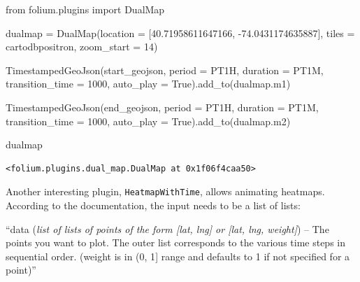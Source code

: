 \documentclass[
  letterpaper,
  DIV=11,
  numbers=noendperiod]{scrreprt}
\newenvironment{Shaded}{\begin{snugshade}}{\end{snugshade}}
\newcommand{\DecValTok}[1]{\textcolor[rgb]{0.68,0.00,0.00}{#1}}
\newcommand{\FloatTok}[1]{\textcolor[rgb]{0.68,0.00,0.00}{#1}}
\newcommand{\ImportTok}[1]{\textcolor[rgb]{0.00,0.46,0.62}{#1}}
\newcommand{\NormalTok}[1]{\textcolor[rgb]{0.00,0.23,0.31}{#1}}
\newcommand{\OperatorTok}[1]{\textcolor[rgb]{0.37,0.37,0.37}{#1}}
\newcommand{\StringTok}[1]{\textcolor[rgb]{0.13,0.47,0.30}{#1}}
\newcommand{\VariableTok}[1]{\textcolor[rgb]{0.07,0.07,0.07}{#1}}
\begin{document}
\begin{Shaded}
\begin{Highlighting}[]
\ImportTok{from}\NormalTok{ folium.plugins }\ImportTok{import}\NormalTok{ DualMap}

\NormalTok{dualmap }\OperatorTok{=}\NormalTok{ DualMap(location }\OperatorTok{=}\NormalTok{ [}\FloatTok{40.71958611647166}\NormalTok{, }\OperatorTok{{-}}\FloatTok{74.0431174635887}\NormalTok{],}
\NormalTok{                 tiles }\OperatorTok{=} \StringTok{\textquotesingle{}cartodbpositron\textquotesingle{}}\NormalTok{,}
\NormalTok{                 zoom\_start }\OperatorTok{=} \DecValTok{14}\NormalTok{)}

\NormalTok{TimestampedGeoJson(start\_geojson,}
\NormalTok{                  period }\OperatorTok{=} \StringTok{\textquotesingle{}PT1H\textquotesingle{}}\NormalTok{,}
\NormalTok{                  duration }\OperatorTok{=} \StringTok{\textquotesingle{}PT1M\textquotesingle{}}\NormalTok{,}
\NormalTok{                  transition\_time }\OperatorTok{=} \DecValTok{1000}\NormalTok{,}
\NormalTok{                  auto\_play }\OperatorTok{=} \VariableTok{True}\NormalTok{).add\_to(dualmap.m1)}

\NormalTok{TimestampedGeoJson(end\_geojson,}
\NormalTok{                  period }\OperatorTok{=} \StringTok{\textquotesingle{}PT1H\textquotesingle{}}\NormalTok{,}
\NormalTok{                  duration }\OperatorTok{=} \StringTok{\textquotesingle{}PT1M\textquotesingle{}}\NormalTok{,}
\NormalTok{                  transition\_time }\OperatorTok{=} \DecValTok{1000}\NormalTok{,}
\NormalTok{                  auto\_play }\OperatorTok{=} \VariableTok{True}\NormalTok{).add\_to(dualmap.m2)}

\NormalTok{dualmap}
\end{Highlighting}
\end{Shaded}

\begin{verbatim}
<folium.plugins.dual_map.DualMap at 0x1f06f4caa50>
\end{verbatim}

Another interesting plugin, \texttt{HeatmapWithTime}, allows animating
heatmaps. According to the documentation, the input needs to be a list
of lists:

``data (\emph{list of lists of points of the form {[}lat, lng{]} or
{[}lat, lng, weight{]}}) -- The points you want to plot. The outer list
corresponds to the various time steps in sequential order. (weight is in
(0, 1{]} range and defaults to 1 if not specified for a point)''
\end{document}
